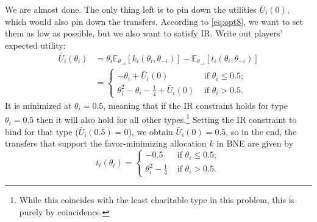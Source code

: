 \documentclass[a4paper]{article}
\begin{document}
\begin{enumerate}
	We are almost done. The only thing left is to pin down the utilities $\bar{U}_i(0)$, which would also pin down the transfers. According to \eqref{eq:opt8}, we want to set them as low as possible, but we also want to satisfy IR. Write out players' expected utility:
	\begin{align*}
		\bar{U}_i (\theta_i) &= \theta_i \mathbb{E}_{\theta_{-i}} [k_i(\theta_i,\theta_{-i})] - \mathbb{E}_{\theta_{-i}} [t_i(\theta_i,\theta_{-i})] 
		\\
		&= \begin{cases}
			-\theta_i + \bar{U}_i(0)	& \text{ if } \theta_i \leq 0.5;
			\\
			\theta_i^2 - \theta_i - \frac{1}{4} + \bar{U}_i(0)	& \text{ if } \theta_i > 0.5.
		\end{cases}
	\end{align*}
	It is minimized at $\theta_i=0.5$, meaning that if the IR constraint holds for type $\theta_i=0.5$ then it will also hold for all other types.\footnote{While this coincides with the least charitable type in this problem, this is purely by coincidence.}
	Setting the IR constraint to bind for that type ($\bar{U}_i(0.5)=0$), we obtain $\bar{U}_i(0) = 0.5$, so in the end, the transfers that support the favor-minimizing allocation $k$ in BNE are given by
	$$t_i(\theta_i) = 
	\begin{cases}
		- 0.5	& \text{ if } \theta_i \leq 0.5;
		\\
		\theta_i^2 - \frac{1}{4}	& \text{ if } \theta_i > 0.5.
	\end{cases}$$
\end{enumerate}
\fi
\end{document}
